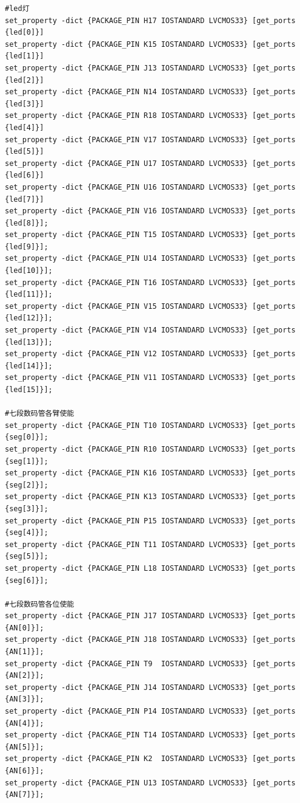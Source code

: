 \documentclass[11pt, a4paper]{article}
\begin{document}
\begin{CJK*}{UTF8}{gbsn}
\begin{appendices}
\begin{verbatim}
#led灯
set_property -dict {PACKAGE_PIN H17 IOSTANDARD LVCMOS33} [get_ports {led[0]}]
set_property -dict {PACKAGE_PIN K15 IOSTANDARD LVCMOS33} [get_ports {led[1]}]
set_property -dict {PACKAGE_PIN J13 IOSTANDARD LVCMOS33} [get_ports {led[2]}]
set_property -dict {PACKAGE_PIN N14 IOSTANDARD LVCMOS33} [get_ports {led[3]}]
set_property -dict {PACKAGE_PIN R18 IOSTANDARD LVCMOS33} [get_ports {led[4]}]
set_property -dict {PACKAGE_PIN V17 IOSTANDARD LVCMOS33} [get_ports {led[5]}]
set_property -dict {PACKAGE_PIN U17 IOSTANDARD LVCMOS33} [get_ports {led[6]}]
set_property -dict {PACKAGE_PIN U16 IOSTANDARD LVCMOS33} [get_ports {led[7]}]
set_property -dict {PACKAGE_PIN V16 IOSTANDARD LVCMOS33} [get_ports {led[8]}]; 
set_property -dict {PACKAGE_PIN T15 IOSTANDARD LVCMOS33} [get_ports {led[9]}]; 
set_property -dict {PACKAGE_PIN U14 IOSTANDARD LVCMOS33} [get_ports {led[10]}]; 
set_property -dict {PACKAGE_PIN T16 IOSTANDARD LVCMOS33} [get_ports {led[11]}]; 
set_property -dict {PACKAGE_PIN V15 IOSTANDARD LVCMOS33} [get_ports {led[12]}]; 
set_property -dict {PACKAGE_PIN V14 IOSTANDARD LVCMOS33} [get_ports {led[13]}]; 
set_property -dict {PACKAGE_PIN V12 IOSTANDARD LVCMOS33} [get_ports {led[14]}]; 
set_property -dict {PACKAGE_PIN V11 IOSTANDARD LVCMOS33} [get_ports {led[15]}];

#七段数码管各臂使能
set_property -dict {PACKAGE_PIN T10 IOSTANDARD LVCMOS33} [get_ports {seg[0]}];
set_property -dict {PACKAGE_PIN R10 IOSTANDARD LVCMOS33} [get_ports {seg[1]}];
set_property -dict {PACKAGE_PIN K16 IOSTANDARD LVCMOS33} [get_ports {seg[2]}];
set_property -dict {PACKAGE_PIN K13 IOSTANDARD LVCMOS33} [get_ports {seg[3]}];
set_property -dict {PACKAGE_PIN P15 IOSTANDARD LVCMOS33} [get_ports {seg[4]}];
set_property -dict {PACKAGE_PIN T11 IOSTANDARD LVCMOS33} [get_ports {seg[5]}];
set_property -dict {PACKAGE_PIN L18 IOSTANDARD LVCMOS33} [get_ports {seg[6]}];

#七段数码管各位使能
set_property -dict {PACKAGE_PIN J17 IOSTANDARD LVCMOS33} [get_ports {AN[0]}];
set_property -dict {PACKAGE_PIN J18 IOSTANDARD LVCMOS33} [get_ports {AN[1]}];
set_property -dict {PACKAGE_PIN T9  IOSTANDARD LVCMOS33} [get_ports {AN[2]}];
set_property -dict {PACKAGE_PIN J14 IOSTANDARD LVCMOS33} [get_ports {AN[3]}];
set_property -dict {PACKAGE_PIN P14 IOSTANDARD LVCMOS33} [get_ports {AN[4]}];
set_property -dict {PACKAGE_PIN T14 IOSTANDARD LVCMOS33} [get_ports {AN[5]}];
set_property -dict {PACKAGE_PIN K2  IOSTANDARD LVCMOS33} [get_ports {AN[6]}];
set_property -dict {PACKAGE_PIN U13 IOSTANDARD LVCMOS33} [get_ports {AN[7]}];


\end{verbatim}
\end{appendices}
\end{CJK*}
\end{document}
